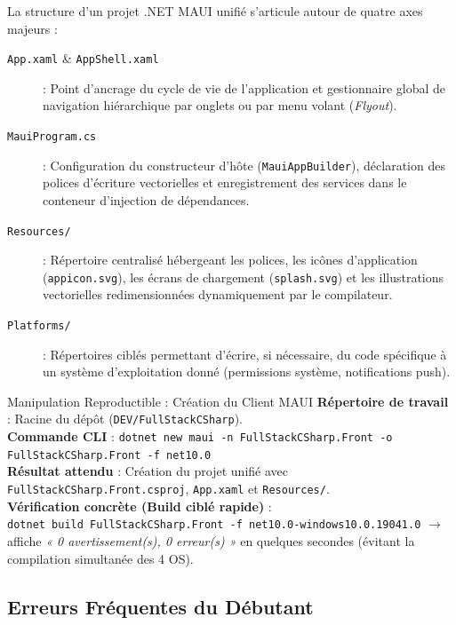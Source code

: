 \documentclass[a4paper,11pt]{report}
\begin{document}
La structure d'un projet .NET MAUI unifié s'articule autour de quatre axes majeurs :

\begin{description}
    \item[\color{indigo}\texttt{App.xaml} \& \texttt{AppShell.xaml}] : Point d'ancrage du cycle de vie de l'application et gestionnaire global de navigation hiérarchique par onglets ou par menu volant (\textit{Flyout}).
    \item[\color{secondary}\texttt{MauiProgram.cs}] : Configuration du constructeur d'hôte (\texttt{MauiAppBuilder}), déclaration des polices d'écriture vectorielles et enregistrement des services dans le conteneur d'injection de dépendances.
    \item[\color{cyanproj!90!black}\texttt{Resources/}] : Répertoire centralisé hébergeant les polices, les icônes d'application (\texttt{appicon.svg}), les écrans de chargement (\texttt{splash.svg}) et les illustrations vectorielles redimensionnées dynamiquement par le compilateur.
    \item[\color{emerald!80!black}\texttt{Platforms/}] : Répertoires ciblés permettant d'écrire, si nécessaire, du code spécifique à un système d'exploitation donné (permissions système, notifications push).
\end{description}

\vspace{0.3cm}

\begin{bestpracticebox}{Manipulation Reproductible : Création du Client MAUI}
\textbf{Répertoire de travail} : Racine du dépôt (\texttt{DEV/FullStackCSharp}).\\[2pt]
\textbf{Commande CLI} : \texttt{dotnet new maui -n FullStackCSharp.Front -o FullStackCSharp.Front -f net10.0}\\[2pt]
\textbf{Résultat attendu} : Création du projet unifié avec \texttt{FullStackCSharp.Front.csproj}, \texttt{App.xaml} et \texttt{Resources/}.\\[2pt]
\textbf{Vérification concrète (Build ciblé rapide)} :\\
\texttt{dotnet build FullStackCSharp.Front -f net10.0-windows10.0.19041.0} $\longrightarrow$ affiche \textit{« 0 avertissement(s), 0 erreur(s) »} en quelques secondes (évitant la compilation simultanée des 4 OS).
\end{bestpracticebox}

\vspace{0.2cm}

\subsection*{Erreurs Fréquentes du Débutant}
\end{document}

